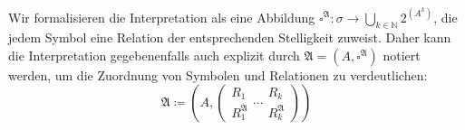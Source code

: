 Wir formalisieren die Interpretation als eine Abbildung $\square^{\mathfrak{A}}:\sigma\rightarrow\bigcup_{k\in\mathbb{N}}2^{\left(A^{k}\right)}$,
die jedem Symbol eine Relation der entsprechenden Stelligkeit zuweist.
Daher kann die Interpretation gegebenenfalls auch explizit durch $\mathfrak{A}=\left(A,\square^{\mathfrak{A}}\right)$
notiert werden, um die Zuordnung von Symbolen und Relationen zu verdeutlichen:
\[
\mathfrak{A}\coloneqq\left(A,\left(\begin{array}{c}
R_{1}\\
R_{1}^{\mathfrak{A}}
\end{array}\cdots\begin{array}{c}
R_{k}\\
R_{k}^{\mathfrak{A}}
\end{array}\right)\right)
\]

